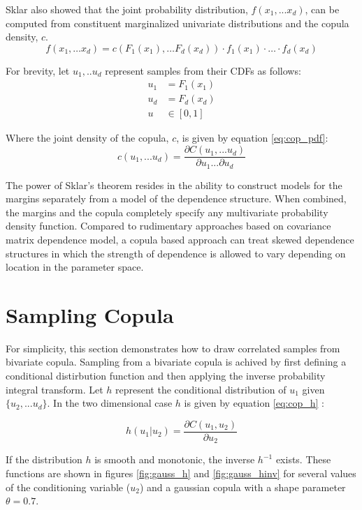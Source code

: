 Sklar also showed that the joint probability distribution, $f(x_1, ... x_d)$, can be computed from
constituent marginalized univariate distributions and the copula density, $c$.
\begin{equation}
f(x_1,\dots x_d)= c(F_1(x_1),\dots F_d(x_d))\cdot f_1(x_1)\cdot\dots\cdot f_d(x_d)
\label{eq:sklar2}
\end{equation}

For brevity, let $u_1, .. u_d$ represent samples from their CDFs as follows:
\begin{align*} u_1 &= F_1(x_1) \\ u_d &= F_d(x_d) \\ u &\in
[0, 1]
\end{align*}

Where the joint density of the copula, $c$, is given by equation \ref{eq:cop_pdf}:
\begin{equation}
c(u_1, ... u_d) = \frac{\partial C(u_1, ... u_d)}{\partial u_1 ... \partial u_d}
\label{eq:cop_pdf}
\end{equation}

The power of Sklar's theorem resides in the ability to construct
models for the margins separately from a model of the dependence structure.
When combined, the margins and the copula completely
specify any multivariate probability density function.
Compared to rudimentary approaches based on covariance matrix dependence model,
a copula based approach can treat skewed dependence structures in which the
strength of dependence is allowed to vary depending on location in the parameter space.

\section*{Sampling Copula}

For simplicity, this section demonstrates how to draw correlated samples from bivariate copula.
Sampling from a bivariate copula is achived by first defining a conditional distirbution function and then applying the inverse probability integral transform.
Let $h$ represent the conditional distribution of $u_1$ given $\{u_2, ... u_d\}$.  In the two dimensional case $h$ is given by equation \ref{eq:cop_h} \cite{Nelsen2006}:

\begin{equation}
h(u_1 | u_2) = \frac{\partial C(u_1, u_2)}{\partial u_2}
\label{eq:cop_h}
\end{equation}

If the distribution $h$ is smooth and monotonic, the inverse $h^{-1}$ exists.  These functions are shown in figures \ref{fig:gauss_h} and \ref{fig:gauss_hinv} for several values of the conditioning variable ($u_2$) and a gaussian copula with a shape parameter $\theta=0.7$.  


